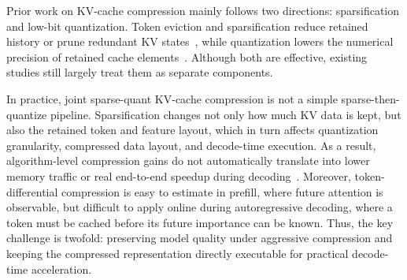 \documentclass[runningheads]{llncs}
\begin{document}
Prior work on KV-cache compression mainly follows two directions: sparsification and low-bit quantization. Token eviction and sparsification reduce retained history or prune redundant KV states~\cite{xiao2024streaming,zhang2023h2o,snapkv,pyramidkv,xu2025think,lv2024kvpruner,joo2025mustafar}, while quantization lowers the numerical precision of retained cache elements~\cite{liu2024kivi,hooper2024kvquant,ashkboos2024quarot,chen2025rotatekvaccuraterobust}. Although both are effective, existing studies still largely treat them as separate components.

In practice, joint sparse-quant KV-cache compression is not a simple sparse-then-quantize pipeline. Sparsification changes not only how much KV data is kept, but also the retained token and feature layout, which in turn affects quantization granularity, compressed data layout, and decode-time execution. As a result, algorithm-level compression gains do not automatically translate into lower memory traffic or real end-to-end speedup during decoding~\cite{agrawal2024sarathiserve,zhong2024distserve,joo2025mustafar}. Moreover, token-differential compression is easy to estimate in prefill, where future attention is observable, but difficult to apply online during autoregressive decoding, where a token must be cached before its future importance can be known. Thus, the key challenge is twofold: preserving model quality under aggressive compression and keeping the compressed representation directly executable for practical decode-time acceleration.
\end{document}

